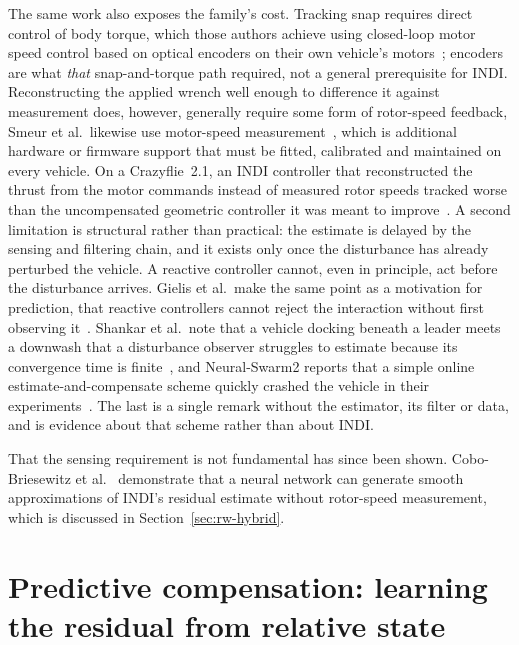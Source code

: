 The same work also exposes the family's cost. Tracking snap requires direct control of body torque,
which those authors achieve using closed-loop motor speed control based on optical encoders on
their own vehicle's motors~\cite{tal2018indi}; encoders are what \emph{that} snap-and-torque path
required, not a general prerequisite for INDI. Reconstructing the applied wrench well enough to
difference it against measurement does, however, generally require some form of rotor-speed
feedback, Smeur et al.\ likewise use motor-speed
measurement~\cite{smeur2017cascadedindi}, which is additional hardware or firmware support that
must be fitted, calibrated and maintained on every vehicle.
On a Crazyflie~2.1, an INDI controller that reconstructed the thrust from the motor commands
instead of measured rotor speeds tracked worse than the uncompensated geometric controller it was
meant to improve~\cite{cobobriesewitz2026lindi}.
A second limitation is structural rather than
practical: the estimate is delayed by the sensing and filtering chain, and it exists only once the
disturbance has already perturbed the vehicle. A reactive controller cannot, even in principle, act
before the disturbance arrives.
Gielis et al.\ make the same point as a motivation for prediction, that reactive controllers cannot
reject the interaction without first observing it~\cite{gielis2023aggregate}. Shankar et al.\ note
that a vehicle docking beneath a leader meets a downwash that a disturbance observer struggles to
estimate because its convergence time is finite~\cite{shankar2023docking}, and Neural-Swarm2 reports
that a simple online estimate-and-compensate scheme quickly crashed the vehicle in their
experiments~\cite{shi2022neuralswarm2}. The last is a single remark without the estimator, its filter
or data, and is evidence about that scheme rather than about INDI.

That the sensing requirement is not fundamental has since been shown. Cobo-Briesewitz et
al.~\cite{cobobriesewitz2026lindi} demonstrate that a neural network can generate smooth
approximations of INDI's residual estimate without rotor-speed measurement, which is discussed in Section~\ref{sec:rw-hybrid}.

\section{Predictive compensation: learning the residual from relative state}
\label{sec:rw-predictive}

